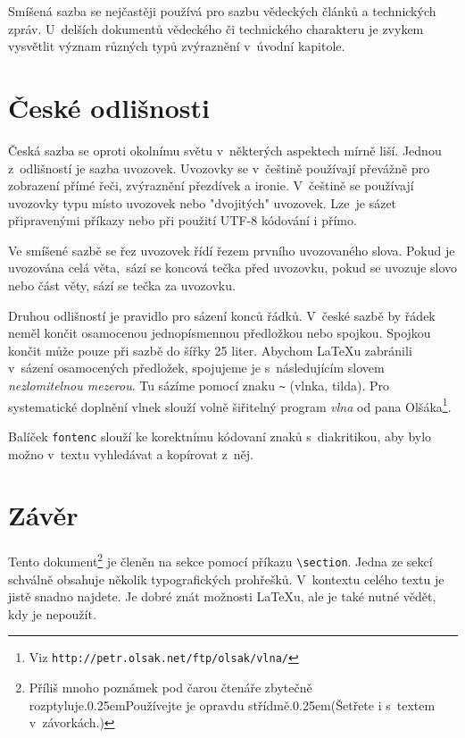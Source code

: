 \documentclass[10pt, a4paper,twocolumn]{article}
\def\,{\kern 0.25em}
\def \lfnote {Příliš mnoho poznámek pod čarou čtenáře zbytečně rozptyluje.\,Používejte je opravdu střídmě.\,(Šetřete i s~textem v~závorkách.)}
\begin{document}
Smíšená sazba se nejčastěji používá pro sazbu vědeckých článků a technických zpráv. U~delších dokumentů vědeckého či technického charakteru je zvykem vysvětlit význam různých typů zvýraznění v~úvodní kapitole.

\section{České odlišnosti}

Česká sazba se oproti okolnímu světu v~některých aspektech mírně liší. Jednou z~odlišností je sazba uvozovek. Uvozovky se v~češtině používají převážně pro zobrazení přímé řeči, zvýraznění přezdívek a ironie. V~češtině se používají uvozovky typu  místo  uvozovek nebo "dvojitých" uvozovek. Lze~je sázet připravenými příkazy nebo při použití UTF-8 kódování i přímo.\par
Ve smíšené sazbě se řez uvozovek řídí řezem prvního uvozovaného slova. Pokud je uvozována celá věta,~sází se koncová tečka před uvozovku, pokud se uvozuje slovo nebo část věty, sází se tečka za uvozovku.\par Druhou odlišností je pravidlo pro sázení konců řádků. V~české sazbě by řádek neměl končit osamocenou jednopísmennou předložkou nebo spojkou. Spojkou  končit může pouze při sazbě do šířky 25 liter. Abychom LaTeXu zabránili v~sázení osamocených předložek, spojujeme je s~následujícím slovem \emph{nezlomitelnou mezerou}. 
Tu sázíme pomocí znaku \verb|~| (vlnka, tilda). Pro systematické doplnění vlnek slouží volně šiřitelný program \emph{vlna} od pana Olšáka\footnote{Viz \texttt{http://petr.olsak.net/ftp/olsak/vlna/} }. \par
Balíček \verb|fontenc| slouží ke korektnímu kódovaní znaků s~diakritikou, aby bylo možno v~textu vyhledávat a kopírovat z~něj.

\section{Závěr}

Tento dokument\footnote{\lfnote} je členěn na sekce pomocí příkazu \verb|\section|. 
Jedna ze sekcí schválně obsahuje několik typografických prohřešků. V~kontextu celého textu je jistě snadno najdete. Je dobré znát možnosti \LaTeX u, ale je také nutné vědět, kdy je nepoužít.
\end{document}
